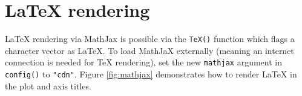 \documentclass[
  12pt,
]{krantz}
\newenvironment{Shaded}{\begin{snugshade}}{\end{snugshade}}
\newcommand{\CharTok}[1]{\textcolor[rgb]{0.31,0.60,0.02}{#1}}
\newcommand{\DataTypeTok}[1]{\textcolor[rgb]{0.13,0.29,0.53}{#1}}
\newcommand{\KeywordTok}[1]{\textcolor[rgb]{0.13,0.29,0.53}{\textbf{#1}}}
\newcommand{\NormalTok}[1]{#1}
\newcommand{\OperatorTok}[1]{\textcolor[rgb]{0.81,0.36,0.00}{\textbf{#1}}}
\newcommand{\StringTok}[1]{\textcolor[rgb]{0.31,0.60,0.02}{#1}}
\begin{document}
\hypertarget{mathjax}{%
\chapter{LaTeX rendering}\label{mathjax}}

LaTeX rendering via MathJax is possible via the \texttt{TeX()} function which flags a character vector as LaTeX. To load MathJaX externally (meaning an internet connection is needed for TeX rendering), set the new \texttt{mathjax} argument in \texttt{config()} to \texttt{"cdn"}. Figure \ref{fig:mathjax} demonstrates how to render LaTeX in the plot and axis titles.

\begin{Shaded}
\end{Shaded}
\end{document}
